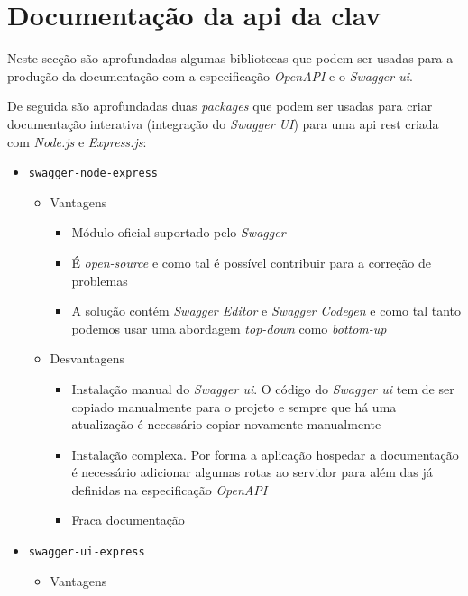 \section{Documentação da \acrshort{api} da \acrshort{clav}}

Neste secção são aprofundadas algumas bibliotecas que podem ser usadas para a produção da documentação com a especificação \textit{OpenAPI} e o \textit{Swagger \acrshort{ui}}. 

De seguida são aprofundadas duas \textit{packages} que podem ser usadas para criar documentação interativa (integração do \textit{Swagger UI}) para uma \acrshort{api} \acrshort{rest} criada com \textit{Node.js} e \textit{Express.js}:~\cite{swaggerNode}
\begin{itemize}
    \item \texttt{swagger-node-express}
    \begin{itemize}
        \item Vantagens
        \begin{itemize}
            \item Módulo oficial suportado pelo \textit{Swagger}
            \item É \textit{open-source} e como tal é possível contribuir para a correção de problemas
            \item A solução contém \textit{Swagger Editor} e \textit{Swagger Codegen} e como tal tanto podemos usar uma abordagem \textit{top-down} como \textit{bottom-up}
        \end{itemize}
        \item Desvantagens
        \begin{itemize}
            \item Instalação manual do \textit{Swagger \acrshort{ui}}. O código do \textit{Swagger \acrshort{ui}} tem de ser copiado manualmente para o projeto e sempre que há uma atualização é necessário copiar novamente manualmente
            \item Instalação complexa. Por forma a aplicação hospedar a documentação é necessário adicionar algumas rotas ao servidor para além das já definidas na especificação \textit{OpenAPI}
            \item Fraca documentação
        \end{itemize}
    \end{itemize}
    \item \texttt{swagger-ui-express}
    \begin{itemize}
        \item Vantagens

\end{itemize}
\end{itemize}
